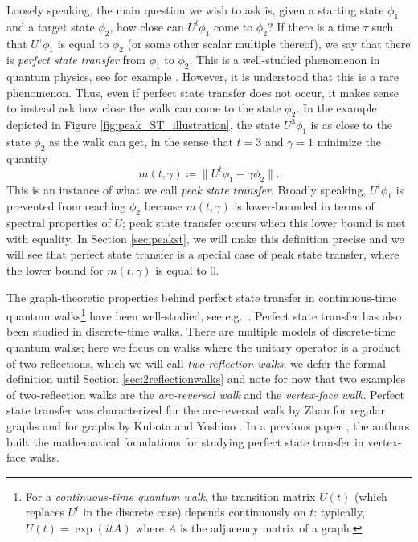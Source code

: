\documentclass{article}
\numberwithin{equation}{section}
\begin{document}
Loosely speaking, the main question we wish to ask is, given a starting state $\phi_1$ and a target state $\phi_2$, how close can $U^{t}\phi_1$ come to $\phi_2$? If there is a time $\tau$ such that $U^{\tau}\phi_1$ is equal to $\phi_2$ (or some other scalar multiple thereof), we say that there is \textsl{perfect state transfer} from $\phi_1$ to $\phi_2$. This is a well-studied phenomenon in quantum physics, see for example \cite{KurWoj2011, YalGed2015, SteSko2016}. However, it is understood that this is a rare phenomenon. Thus, even if perfect state transfer does not occur, it makes sense to instead  ask how close the walk can come to the state $\phi_2$. In the example depicted in  Figure \ref{fig:peak_ST_illustration}, the state $U^3\phi_1$ is as close to the state $\phi_2$ as the walk can get, in the sense that $t = 3$ and $\gamma = 1$ minimize the quantity
\begin{equation}\label{eq:intro-peak-quantity}
  m(t,\gamma) \coloneq \|U^t\phi_1 - \gamma\phi_2\| .
\end{equation}
This is an instance of what we call \textsl{peak state transfer}. 
Broadly speaking, $U^{t}\phi_1$ is prevented from reaching $\phi_2$ because $ m(t,\gamma)$ is lower-bounded in terms of spectral properties of $U$; peak state transfer occurs when this lower bound is met with equality.  In Section \ref{sec:peakst}, we will make this definition precise and we will see that perfect state transfer is a special case of peak state transfer, where the lower bound for $m(t,\gamma)$ is equal to $0$.

The graph-theoretic properties behind perfect state transfer in continuous-time quantum walks\footnote{For a \textsl{continuous-time quantum walk}, the transition matrix $U(t)$ (which replaces $U^t$ in the discrete case) depends continuously on $t$: typically, $U(t) = \exp(itA)$ where $A$ is the adjacency matrix of a graph.} have been well-studied, see e.g.\ \cite{CheGod2011,CouGodGuo2015,GodGuoKem2020}.  Perfect state transfer has also been studied in discrete-time walks. There are multiple models of discrete-time quantum walks; here we focus on walks where the unitary operator is a product of two reflections, which we will call \textsl{two-reflection walks}; we defer the formal definition until Section \ref{sec:2reflectionwalks} and note for now that two examples of two-reflection walks are the \textsl{arc-reversal walk} and the \textsl{vertex-face walk}. 
Perfect state transfer was characterized for the arc-reversal walk by Zhan \cite{Zha2019} for regular graphs and  for graphs by Kubota and Yoshino \cite{KubYos2024}. In a previous paper \cite{GuoSch2024}, the authors built the mathematical foundations for studying  perfect state transfer in vertex-face walks. 
\end{document}
